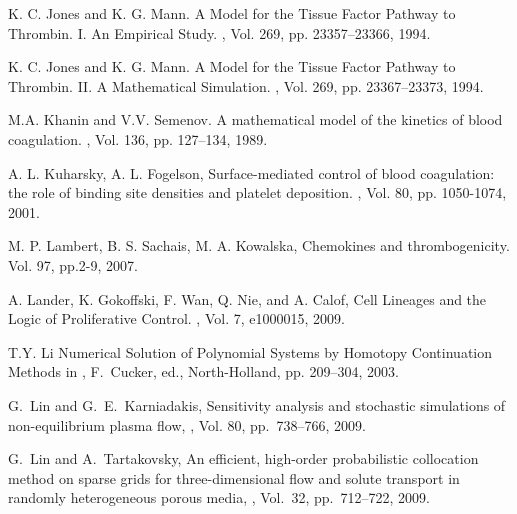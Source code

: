 \begin{thebibliography}{99}
K. C. Jones and K. G. Mann.
\newblock A Model for the Tissue Factor Pathway to Thrombin. I. An Empirical Study.
, Vol. 269, pp. 23357--23366, 1994.

K. C. Jones and K. G. Mann.
\newblock A Model for the Tissue Factor Pathway to Thrombin. II. A Mathematical Simulation.
, Vol. 269, pp. 23367--23373, 1994.

M.A. Khanin  and V.V. Semenov.
\newblock A mathematical model of the kinetics of blood coagulation.
, Vol. 136, pp. 127--134, 1989.



A. L. Kuharsky, A. L. Fogelson,
\newblock Surface-mediated control of blood coagulation: the role of binding site densities and platelet
deposition.
, Vol. 80, pp. 1050-1074, 2001.

M. P. Lambert, B. S. Sachais, M. A. Kowalska, \newblock Chemokines
and thrombogenicity. 
Vol. 97, pp.2-9, 2007.

A. Lander, K. Gokoffski, F. Wan, Q. Nie, and A. Calof, \newblock
Cell Lineages and the Logic of Proliferative Control. , Vol. 7, e1000015, 2009.

 T.Y. Li \newblock Numerical Solution of Polynomial
   Systems by Homotopy Continuation Methods  in
,
   F.~Cucker,   ed.,
   North-Holland, pp. 209--304, 2003.

\newblock G.~Lin and G.~E.~Karniadakis, \newblock Sensitivity analysis and stochastic simulations of
\newblock non-equilibrium plasma flow,  , Vol. 80, pp.~738--766, 2009.

\newblock G.~Lin and A.~Tartakovsky, \newblock An efficient, high-order probabilistic collocation method
\newblock on sparse grids for three-dimensional flow and solute
\newblock  transport in randomly heterogeneous porous media, , Vol.~32, pp.~712--722, 2009.


\end{thebibliography}
